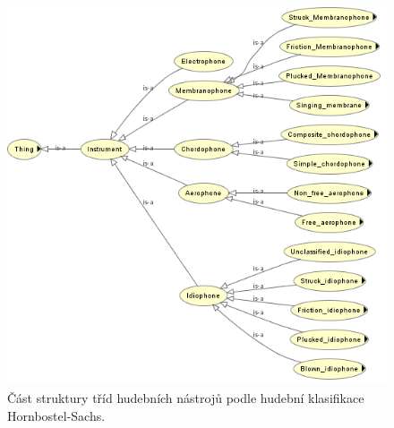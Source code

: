 \begin{figure}[h]
\begin{center}
\includegraphics[width=13cm]{figures/mpo_instruments}
\caption{Část struktury tříd hudebních nástrojů podle hudební klasifikace Hornbostel-Sachs.}
\label{img:ontoFinalInstruments}
\end{center}
\end{figure}

